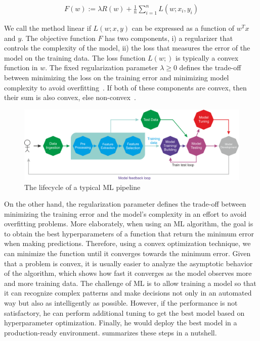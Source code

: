 \vspace{-4mm}
\begin{align}
    F(w):=\lambda R(w)+\frac{1}{n} \sum_{i=1}^{n} L\left(w ; x_{i}, y_{i}\right)
\end{align}

\hspace*{3.5mm} We call the method linear if $L(w;x,y)$ can be expressed as a function of $w^Tx$ and $y$. The objective function $F$ has two components, i) a regularizer that controls the complexity of the model, ii) the loss that measures the error of the model on the training data. The loss function $L(w;)$ is typically a convex function in $w$. The fixed regularization parameter $\lambda \geq 0$ defines the trade-off between minimizing the loss on the training error and minimizing model complexity to avoid overfitting~\cite{karim2018scala}. If both of these components are convex, then their sum is also convex, else non-convex~\cite{zaccone2018deep}. 

\begin{figure}[h]
	\centering
	\includegraphics[width=0.95\linewidth]{images/B08452_01_02.png}
	\caption{The lifecycle of a typical ML pipeline~\cite{karimScalaML2019}} 
	\label{fig:ml_pipeline}
\end{figure}

\hspace*{3.5mm} On the other hand, the regularization parameter defines the trade-off between minimizing the training error and the model's complexity in an effort to avoid overfitting problems. More elaborately, when using an ML algorithm, the goal is to obtain the best hyperparameters of a function that return the minimum error when making predictions. Therefore, using a convex optimization technique, we can minimize the function until it converges towards the minimum error. Given that a problem is convex, it is usually easier to analyze the asymptotic behavior of the algorithm, which shows how fast it converges as the model observes more and more training data. The challenge of ML is to allow training a model so that it can recognize complex patterns and make decisions not only in an automated way but also as intelligently as possible. However, if the performance is not satisfactory, he can perform additional tuning to get the best model based on hyperparameter optimization. Finally, he would deploy the best model in a production-ready environment.  summarizes these steps in a nutshell. 

